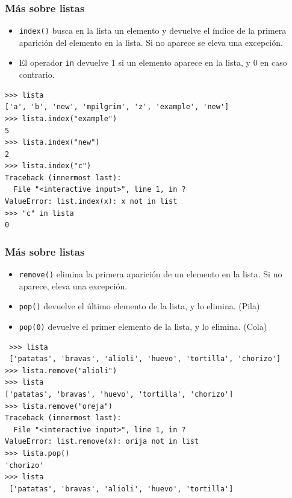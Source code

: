 \begin{frame}[fragile]
\frametitle{Más sobre listas}

\begin{itemize}
\item \verb|index()| busca en la lista un elemento y devuelve el
  índice de la primera aparición del elemento en la lista. Si no
  aparece se eleva una excepción.
\item El operador \verb|in| devuelve 1 si un elemento aparece en la
  lista, y 0 en caso contrario.
\end{itemize}

\begin{footnotesize}
\begin{verbatim}
>>> lista
['a', 'b', 'new', 'mpilgrim', 'z', 'example', 'new']
>>> lista.index("example") 
5
>>> lista.index("new")     
2
>>> lista.index("c")       
Traceback (innermost last):
  File "<interactive input>", line 1, in ?
ValueError: list.index(x): x not in list
>>> "c" in lista           
0
\end{verbatim}
\end{footnotesize}

\end{frame}




\begin{frame}[fragile]
\frametitle{Más sobre listas}

\begin{itemize}
\item \verb|remove()| elimina la primera aparición de un elemento en
  la lista. Si no aparece, eleva una excepción.
\item \verb|pop()| devuelve el último elemento de la lista, y lo elimina. (Pila) 
\item \verb|pop(0)| devuelve el primer elemento de la lista, y lo elimina. (Cola)
\end{itemize}

\begin{footnotesize}
\begin{verbatim}
 >>> lista
 ['patatas', 'bravas', 'alioli', 'huevo', 'tortilla', 'chorizo']
>>> lista.remove("alioli") 
>>> lista
['patatas', 'bravas', 'huevo', 'tortilla', 'chorizo']
>>> lista.remove("oreja")   
Traceback (innermost last):
  File "<interactive input>", line 1, in ?
ValueError: list.remove(x): orija not in list
>>> lista.pop()         
'chorizo'
>>> lista
 ['patatas', 'bravas', 'alioli', 'huevo', 'tortilla']
\end{verbatim}
\end{footnotesize}

\end{frame}




